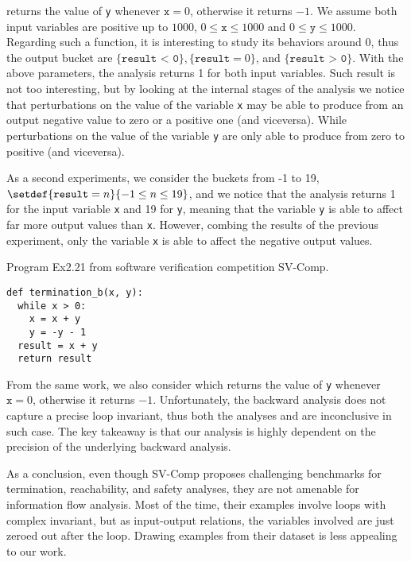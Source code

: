  returns the value of \texttt{y} whenever $\texttt{x} = 0$, otherwise it returns $-1$.
We assume both input variables are positive up to $1000$, $0 \le \texttt{x} \le 1000$ and $0 \le \texttt{y} \le 1000$.
Regarding such a function, it is interesting to study its behaviors around $0$, thus the output bucket are $\{ \texttt{result < 0} \}, \{ \texttt{result} = 0 \}$, and $\{ \texttt{result > 0} \}$.
With the above parameters, the analysis \outcomesname{} returns 1 for both input variables.
Such result is not too interesting, but by looking at the internal stages of the analysis we notice that perturbations on the value of the variable \texttt{x} may be able to produce from an output negative value to zero or a positive one (and viceversa).
While perturbations on the value of the variable \texttt{y} are only able to produce from zero to positive (and viceversa).

As a second experiments, we consider the buckets from -1 to 19, $\setdef{ \texttt{result} = n}{-1 \le n \le 19}$, and we notice that the analysis \outcomesname{} returns 1 for the input variable \texttt{x} and 19 for \texttt{y}, meaning that the variable \texttt{y} is able to affect far more output values than \texttt{x}. However, combing the results of the previous experiment, only the variable \texttt{x} is able to affect the negative output values.

\begin{marginlisting}[-1.4cm]
  \caption{Program Ex2.21 from software verification competition SV-Comp.}
  \vspace{15pt}
\begin{lstlisting}[style=mystyle,
  language=customPython,
  escapechar=\%,
]
def termination_b(x, y):
  while x > 0:
    x = x + y
    y = -y - 1
  result = x + y
  return result
\end{lstlisting}
\end{marginlisting}

From the same work, we also consider  which returns the value of \texttt{y} whenever $\texttt{x} = 0$, otherwise it returns $-1$.
Unfortunately, the backward analysis does not capture a precise loop invariant, thus both the analyses \outcomesname{} and \rangename are inconclusive in such case.
The key takeaway is that our analysis is highly dependent on the precision of the underlying backward analysis.

As a conclusion, even though SV-Comp proposes challenging benchmarks for termination, reachability, and safety analyses, they are not amenable for information flow analysis.
Most of the time, their examples involve loops with complex invariant, but as input-output relations, the variables involved are just zeroed out after the loop.
Drawing examples from their dataset is less appealing to our work.

